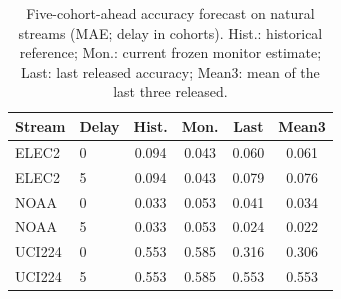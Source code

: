 \begin{table}[h]
\centering
\caption{Five-cohort-ahead accuracy forecast on natural streams (MAE; delay in cohorts). Hist.: historical reference; Mon.: current frozen monitor estimate; Last: last released accuracy; Mean3: mean of the last three released.}
\label{tab:extforecast}
\footnotesize
\setlength{\tabcolsep}{4pt}
\begin{tabular}{llcccc}
\toprule
Stream & Delay & Hist. & Mon. & Last & Mean3 \\
\midrule
ELEC2 & 0 & 0.094 & 0.043 & 0.060 & 0.061 \\
ELEC2 & 5 & 0.094 & 0.043 & 0.079 & 0.076 \\
NOAA & 0 & 0.033 & 0.053 & 0.041 & 0.034 \\
NOAA & 5 & 0.033 & 0.053 & 0.024 & 0.022 \\
UCI224 & 0 & 0.553 & 0.585 & 0.316 & 0.306 \\
UCI224 & 5 & 0.553 & 0.585 & 0.553 & 0.553 \\
\bottomrule
\end{tabular}
\end{table}
